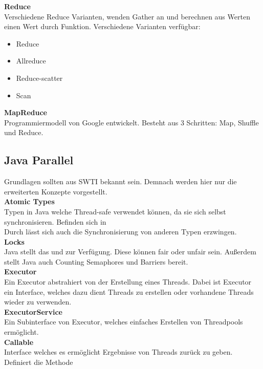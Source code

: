 \textbf{Reduce}\\
Verschiedene Reduce Varianten, wenden Gather an und berechnen aus Werten einen Wert durch Funktion.
Verschiedene Varianten verfügbar:
\begin{itemize}
  \item Reduce
  \item Allreduce
  \item Reduce-scatter
  \item Scan
\end{itemize}


\textbf{MapReduce}\\
Programmiermodell von Google entwickelt.
Besteht aus 3 Schritten: Map, Shuffle und Reduce.

\newpage
\subsection{Java Parallel}%
\label{pp:sub:javas-parallel}
Grundlagen sollten aus SWTI bekannt sein. Demnach werden hier nur die erweiterten Konzepte vorgestellt.\\

\textbf{Atomic Types}\\
Typen in Java welche Thread-safe verwendet können, da sie sich selbst synchronisieren.
Befinden sich in \\
Durch  lässt sich auch die Synchronisierung von anderen Typen erzwingen.\\

\textbf{Locks}\\
Java stellt das  und  zur Verfügung. Diese können fair oder unfair sein.
Außerdem stellt Java auch Counting Semaphores und Barriers bereit.\\

\textbf{Executor}\\
Ein Executor abstrahiert von der Erstellung eines Threads. Dabei ist Executor ein Interface, welches dazu dient Threads zu erstellen
oder vorhandene Threads wieder zu verwenden.\\

\textbf{ExecutorService}\\
Ein Subinterface von Executor, welches einfaches Erstellen von Threadpools ermöglicht.\\

\textbf{Callable}\\
Interface welches es ermöglicht Ergebnisse von Threads zurück zu geben.
Definiert die Methode \\

